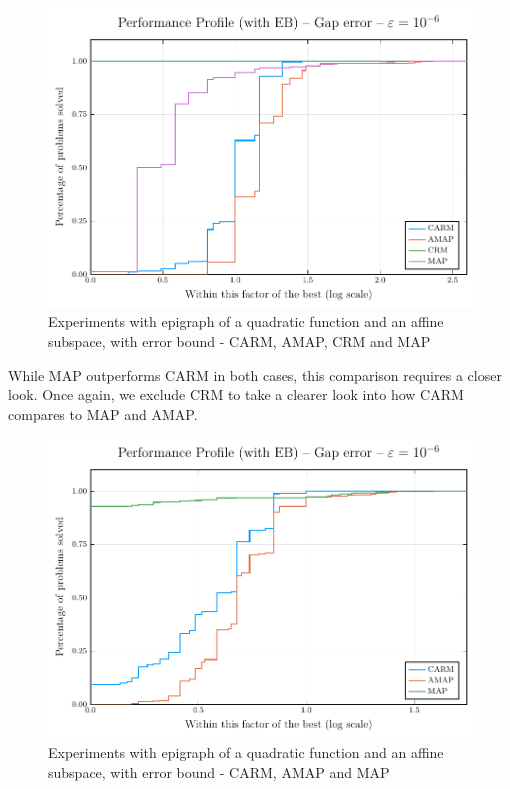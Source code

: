\documentclass[smallextended,numbook,nospthms]{svjour3}
\theoremstyle{plain}
\theoremstyle{definition}
\begin{document}
\begin{figure}[h!]
	\centering
	\includegraphics[scale=0.7]{fig1EB}
	\caption{Experiments with epigraph of a quadratic function and an affine subspace, with error bound - CARM, AMAP, CRM and MAP}
	\label{fig:perprof EB 1}
\end{figure}

\newpage

While MAP outperforms CARM in both cases, this comparison requires a closer look. Once again, we exclude CRM to take a clearer look into how CARM compares to MAP and AMAP.

\begin{figure}[h!]
	\centering
	\includegraphics[scale=0.7]{fig2EB}
	\caption{Experiments with epigraph of a quadratic function and an affine subspace, with error bound - CARM, AMAP and MAP}
	\label{fig:perprof EB 2}
\end{figure}
\end{document}
